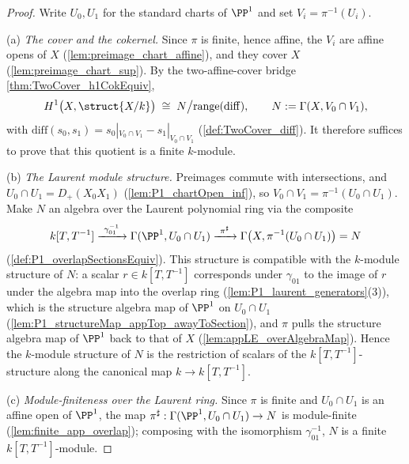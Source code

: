 \begin{proof}
  \leanok
  Write \(U_0, U_1\) for the standard charts of \(\PP^1\) and set
  \(V_i = \pi^{-1}(U_i)\).

  (a) \emph{The cover and the cokernel.} Since \(\pi\) is finite, hence affine, the
  \(V_i\) are affine opens of \(X\) (\ref{lem:preimage_chart_affine}), and they cover
  \(X\) (\ref{lem:preimage_chart_sup}). By the two-affine-cover bridge
  \ref{thm:TwoCover_h1CokEquiv},
  \[
    H^1\bigl(X, \struct{X/k}\bigr) \;\cong\;
      N \big/ \mathrm{range}(\mathrm{diff}),
    \qquad N := \Gamma(X, V_0 \cap V_1),
  \]
  with \(\mathrm{diff}(s_0, s_1) = s_0|_{V_0 \cap V_1} - s_1|_{V_0 \cap V_1}\)
  (\ref{def:TwoCover_diff}). It therefore suffices to prove that this quotient is a
  finite \(k\)-module.

  (b) \emph{The Laurent module structure.} Preimages commute with intersections, and
  \(U_0 \cap U_1 = D_+(X_0X_1)\) (\ref{lem:P1_chartOpen_inf}), so
  \(V_0 \cap V_1 = \pi^{-1}(U_0 \cap U_1)\). Make \(N\) an algebra over the Laurent
  polynomial ring via the composite
  \[
    k[T, T^{-1}] \xrightarrow{\ \gamma_{01}^{-1}\ } \Gamma(\PP^1, U_0 \cap U_1)
      \xrightarrow{\ \pi^\sharp\ } \Gamma\bigl(X, \pi^{-1}(U_0 \cap U_1)\bigr) = N
  \]
  (\ref{def:P1_overlapSectionsEquiv}). This structure is compatible with the \(k\)-module
  structure of \(N\): a scalar \(r \in k[T,T^{-1}]\) corresponds under \(\gamma_{01}\) to
  the image of \(r\) under the algebra map into the overlap ring
  (\ref{lem:P1_laurent_generators}(3)), which is the structure algebra map of \(\PP^1\)
  on \(U_0 \cap U_1\) (\ref{lem:P1_structureMap_appTop_awayToSection}), and \(\pi\) pulls
  the structure algebra map of \(\PP^1\) back to that of \(X\)
  (\ref{lem:appLE_overAlgebraMap}). Hence the \(k\)-module structure of \(N\) is the
  restriction of scalars of the \(k[T,T^{-1}]\)-structure along the canonical map
  \(k \to k[T,T^{-1}]\).

  (c) \emph{Module-finiteness over the Laurent ring.} Since \(\pi\) is finite and
  \(U_0 \cap U_1\) is an affine open of \(\PP^1\), the map
  \(\pi^\sharp : \Gamma(\PP^1, U_0 \cap U_1) \to N\) is module-finite
  (\ref{lem:finite_app_overlap}); composing with the isomorphism \(\gamma_{01}^{-1}\),
  \(N\) is a finite \(k[T,T^{-1}]\)-module.


\end{proof}
